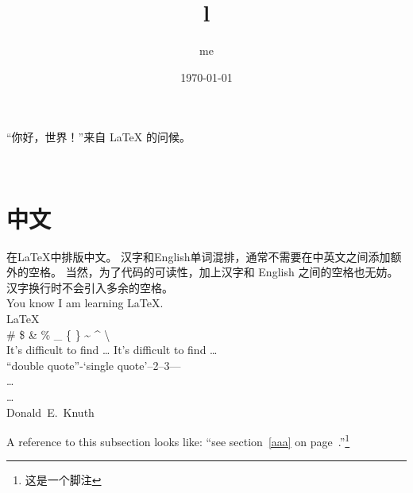 \documentclass{ctexart}
\begin{document}
“你好，世界！”来自 \LaTeX{} 的问候。\\
\title{l}
\author{me}
\date{\today}
\maketitle
\tableofcontents 
 \\ \par
\section{中文}

在\LaTeX{}中排版中文。
汉字和English单词混排，通常不需要在中英文之间添加额外的空格。
当然，为了代码的可读性，加上汉字和 English 之间的空格也无妨。
汉字换行时不会引入多余的空格。\\
You know
I am learning \LaTeX{}.\\
\LaTeX{} \\
\# \$ \& \% \_ \{ \} \~{} \^{}  \textbackslash \\
It's difficult to find \ldots\newline
It's dif{}f{}icult to f{}ind \ldots \\
``double quote''-`single quote'--2--3---\\

\dots \\
\ldots \\
Donald~E.~Knuth  

 \par

A reference to this subsection
\label{aaa} looks like:
``see section~\ref{aaa} on
page~\pageref{aaa}.''\footnote{这是一个脚注}
\end{document}
